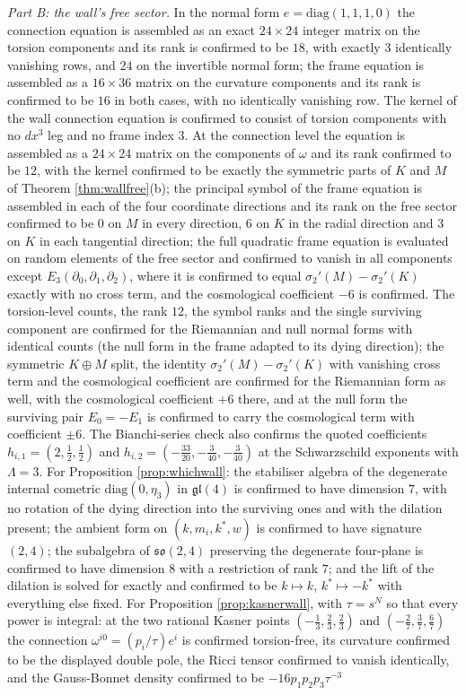 \documentclass[11pt]{article}
\theoremstyle{definition}
\begin{document}
\emph{Part B: the wall's free sector.} In the normal form $e = \mathrm{diag}(1,1,1,0)$ the connection equation is assembled as an exact $24\times 24$ integer matrix on the torsion components and its rank is confirmed to be $18$, with exactly $3$ identically vanishing rows, and $24$ on the invertible normal form; the frame equation is assembled as a $16\times 36$ matrix on the curvature components and its rank is confirmed to be $16$ in both cases, with no identically vanishing row. The kernel of the wall connection equation is confirmed to consist of torsion components with no $dx^3$ leg and no frame index $3$. At the connection level the equation is assembled as a $24\times 24$ matrix on the components of $\omega$ and its rank confirmed to be $12$, with the kernel confirmed to be exactly the symmetric parts of $K$ and $M$ of Theorem \ref{thm:wallfree}(b); the principal symbol of the frame equation is assembled in each of the four coordinate directions and its rank on the free sector confirmed to be $0$ on $M$ in every direction, $6$ on $K$ in the radial direction and $3$ on $K$ in each tangential direction; the full quadratic frame equation is evaluated on random elements of the free sector and confirmed to vanish in all components except $E_3(\partial_0,\partial_1,\partial_2)$, where it is confirmed to equal $\sigma_2'(M) - \sigma_2'(K)$ exactly with no cross term, and the cosmological coefficient $-6$ is confirmed. The torsion-level counts, the rank $12$, the symbol ranks and the single surviving component are confirmed for the Riemannian and null normal forms with identical counts (the null form in the frame adapted to its dying direction); the symmetric $K \oplus M$ split, the identity $\sigma_2'(M) - \sigma_2'(K)$ with vanishing cross term and the cosmological coefficient are confirmed for the Riemannian form as well, with the cosmological coefficient $+6$ there, and at the null form the surviving pair $E_0 = -E_1$ is confirmed to carry the cosmological term with coefficient $\pm 6$. The Bianchi-series check also confirms the quoted coefficients $h_{i,1} = (2, \tfrac12, \tfrac12)$ and $h_{i,2} = (-\tfrac{33}{20}, -\tfrac{3}{40}, -\tfrac{3}{40})$ at the Schwarzschild exponents with $\Lambda = 3$. For Proposition \ref{prop:whichwall}: the stabiliser algebra of the degenerate internal cometric $\mathrm{diag}(0,\eta_3)$ in $\mathfrak{gl}(4)$ is confirmed to have dimension $7$, with no rotation of the dying direction into the surviving ones and with the dilation present; the ambient form on $(k, m_i, k^*, w)$ is confirmed to have signature $(2,4)$; the subalgebra of $\mathfrak{so}(2,4)$ preserving the degenerate four-plane is confirmed to have dimension $8$ with a restriction of rank $7$; and the lift of the dilation is solved for exactly and confirmed to be $k \mapsto k$, $k^* \mapsto -k^*$ with everything else fixed. For Proposition \ref{prop:kasnerwall}, with $\tau = s^N$ so that every power is integral: at the two rational Kasner points $(-\tfrac13,\tfrac23,\tfrac23)$ and $(-\tfrac27,\tfrac37,\tfrac67)$ the connection $\omega^{i0} = (p_i/\tau)e^i$ is confirmed torsion-free, its curvature confirmed to be the displayed double pole, the Ricci tensor confirmed to vanish identically, and the Gauss-Bonnet density confirmed to be $-16p_1p_2p_3\tau^{-3}$ 
\end{document}
